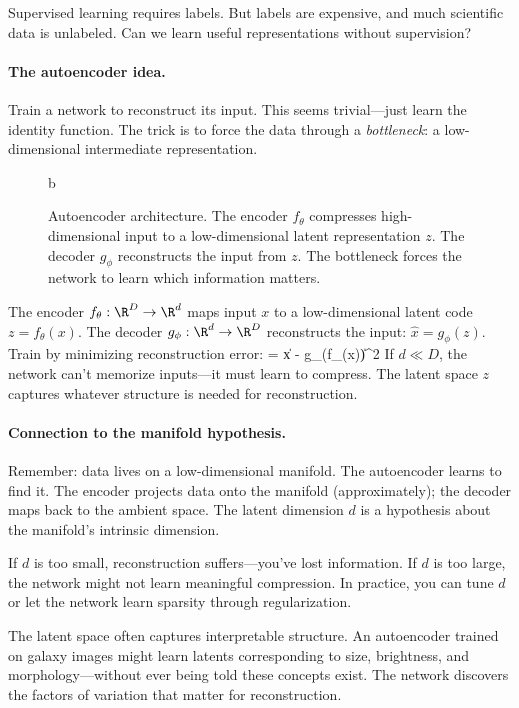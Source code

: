 \documentclass[11pt]{article}
\begin{document}
Supervised learning requires labels. But labels are expensive, and much scientific data is unlabeled. Can we learn useful representations without supervision?

\paragraph{The autoencoder idea.} Train a network to reconstruct its input. This seems trivial---just learn the identity function. The trick is to force the data through a \emph{bottleneck}: a low-dimensional intermediate representation.

\begin{figure}[h]
\centering
b
\caption{Autoencoder architecture. The encoder $f_\theta$ compresses high-dimensional input to a low-dimensional latent representation $z$. The decoder $g_\phi$ reconstructs the input from $z$. The bottleneck forces the network to learn which information matters.}
\label{fig:autoencoder}
\end{figure}

The encoder $f_\theta: \R^D \to \R^d$ maps input $x$ to a low-dimensional latent code $z = f_\theta(x)$. The decoder $g_\phi: \R^d \to \R^D$ reconstructs the input: $\hat{x} = g_\phi(z)$. Train by minimizing reconstruction error:
\beq
{} = \|x - g_\phi(f_\theta(x))\|^2
\eeq
If $d \ll D$, the network can't memorize inputs---it must learn to compress. The latent space $z$ captures whatever structure is needed for reconstruction.

\paragraph{Connection to the manifold hypothesis.} Remember: data lives on a low-dimensional manifold. The autoencoder learns to find it. The encoder projects data onto the manifold (approximately); the decoder maps back to the ambient space. The latent dimension $d$ is a hypothesis about the manifold's intrinsic dimension.

If $d$ is too small, reconstruction suffers---you've lost information. If $d$ is too large, the network might not learn meaningful compression. In practice, you can tune $d$ or let the network learn sparsity through regularization.

The latent space often captures interpretable structure. An autoencoder trained on galaxy images might learn latents corresponding to size, brightness, and morphology---without ever being told these concepts exist. The network discovers the factors of variation that matter for reconstruction.
\end{document}
